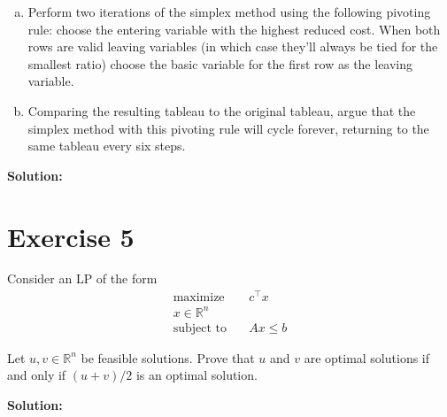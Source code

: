 \documentclass{article}
\begin{document}
\begin{enumerate}[(a)]
\item Perform two iterations of the simplex method using the following pivoting rule: choose the entering variable with the highest reduced cost. When both rows are valid leaving variables (in which case they'll always be tied for the smallest ratio) choose the basic variable for the first row as the leaving variable.
\item Comparing the resulting tableau to the original tableau, argue that the simplex method with this pivoting rule will cycle forever, returning to the same tableau every six steps.
\end{enumerate}

\textbf{Solution: }
\newpage

\section*{Exercise 5}
Consider an LP of the form
\begin{align*}
\text{maximize} \quad & c^\top x \\
x \in \mathbb{R}^n \\
\text{subject to} \quad & Ax \leq b
\end{align*}

Let $u, v \in \mathbb{R}^n$ be feasible solutions. Prove that $u$ and $v$ are optimal solutions if and only if $(u + v)/2$ is an optimal solution.

\textbf{Solution: }
\end{document}
